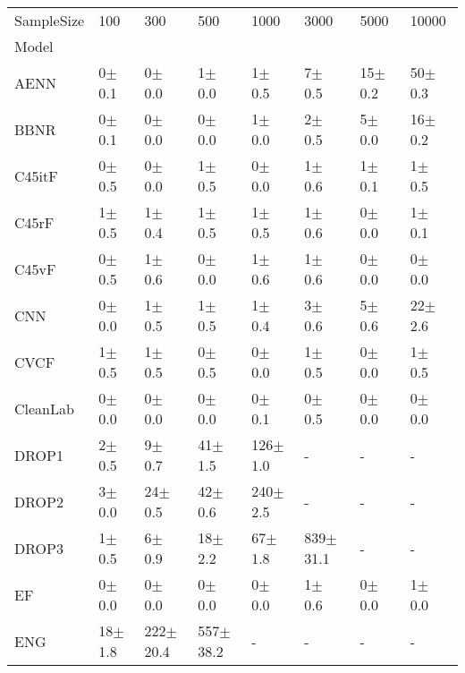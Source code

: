 \begin{tabular}{llllllll}
\toprule
SampleSize &        100   &          300   &          500   &         1000  &          3000  &        5000  &         10000 \\
Model            &              &                &                &               &                &              &               \\
\midrule
AENN             &   0$\pm$ 0.1 &     0$\pm$ 0.0 &     1$\pm$ 0.0 &    1$\pm$ 0.5 &     7$\pm$ 0.5 &  15$\pm$ 0.2 &   50$\pm$ 0.3 \\
BBNR             &   0$\pm$ 0.1 &     0$\pm$ 0.0 &     0$\pm$ 0.0 &    1$\pm$ 0.0 &     2$\pm$ 0.5 &   5$\pm$ 0.0 &   16$\pm$ 0.2 \\
C45itF           &   0$\pm$ 0.5 &     0$\pm$ 0.0 &     1$\pm$ 0.5 &    0$\pm$ 0.0 &     1$\pm$ 0.6 &   1$\pm$ 0.1 &    1$\pm$ 0.5 \\
C45rF            &   1$\pm$ 0.5 &     1$\pm$ 0.4 &     1$\pm$ 0.5 &    1$\pm$ 0.5 &     1$\pm$ 0.6 &   0$\pm$ 0.0 &    1$\pm$ 0.1 \\
C45vF            &   0$\pm$ 0.5 &     1$\pm$ 0.6 &     0$\pm$ 0.0 &    1$\pm$ 0.6 &     1$\pm$ 0.6 &   0$\pm$ 0.0 &    0$\pm$ 0.0 \\
CNN              &   0$\pm$ 0.0 &     1$\pm$ 0.5 &     1$\pm$ 0.5 &    1$\pm$ 0.4 &     3$\pm$ 0.6 &   5$\pm$ 0.6 &   22$\pm$ 2.6 \\
CVCF             &   1$\pm$ 0.5 &     1$\pm$ 0.5 &     0$\pm$ 0.5 &    0$\pm$ 0.0 &     1$\pm$ 0.5 &   0$\pm$ 0.0 &    1$\pm$ 0.5 \\
CleanLab         &   0$\pm$ 0.0 &     0$\pm$ 0.0 &     0$\pm$ 0.0 &    0$\pm$ 0.1 &     0$\pm$ 0.5 &   0$\pm$ 0.0 &    0$\pm$ 0.0 \\
DROP1            &   2$\pm$ 0.5 &     9$\pm$ 0.7 &    41$\pm$ 1.5 &  126$\pm$ 1.0 &              - &            - &             - \\
DROP2            &   3$\pm$ 0.0 &    24$\pm$ 0.5 &    42$\pm$ 0.6 &  240$\pm$ 2.5 &              - &            - &             - \\
DROP3            &   1$\pm$ 0.5 &     6$\pm$ 0.9 &    18$\pm$ 2.2 &   67$\pm$ 1.8 &  839$\pm$ 31.1 &            - &             - \\
EF               &   0$\pm$ 0.0 &     0$\pm$ 0.0 &     0$\pm$ 0.0 &    0$\pm$ 0.0 &     1$\pm$ 0.6 &   0$\pm$ 0.0 &    1$\pm$ 0.0 \\
ENG              &  18$\pm$ 1.8 &  222$\pm$ 20.4 &  557$\pm$ 38.2 &             - &              - &            - &             - \\

\end{tabular}
